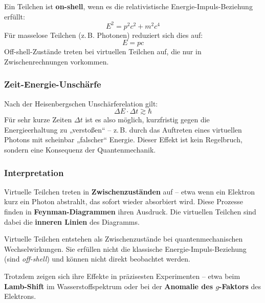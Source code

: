 \begin{tcolorbox}[hinweisbox, title=On-shell-Bedingung]
	\label{box:On-shell-Bedingung}
	Ein Teilchen ist \textbf{on-shell}, wenn es die relativistische Energie-Impuls-Beziehung erfüllt:
	\[
	E^2 = p^2 c^2 + m^2 c^4
	\]
	Für masselose Teilchen (z.\,B. Photonen) reduziert sich dies auf:
	\[
	E = pc
	\]
	Off-shell-Zustände treten bei virtuellen Teilchen auf, die nur in Zwischenrechnungen vorkommen.
\end{tcolorbox}

\subsubsection*{Zeit-Energie-Unschärfe}
Nach der Heisenbergschen Unschärferelation gilt:
\[
\Delta E \cdot \Delta t \gtrsim \hbar
\]\index{$\hbar$}
Für sehr kurze Zeiten $\Delta t$ ist es also möglich, kurzfristig gegen die Energieerhaltung zu „verstoßen“ – z.\,B. durch das Auftreten eines virtuellen Photons mit scheinbar „falscher“ Energie.
Dieser Effekt ist kein Regelbruch, sondern eine Konsequenz der Quantenmechanik.

\subsubsection*{Interpretation}

Virtuelle Teilchen treten in \textbf{Zwischenzuständen} auf – etwa wenn ein Elektron kurz ein Photon abstrahlt, das sofort wieder absorbiert wird.
Diese Prozesse finden in \textbf{Feynman-Diagrammen} ihren Ausdruck. Die virtuellen Teilchen sind dabei die \textbf{inneren Linien} des Diagramms.

\medskip


\medskip
\begin{tcolorbox}[physikbox, title=Virtuelle Teilchen im Quantenvakuum, label=box:virtuelle-teilchen]
	\label{box:virtuelle-teilchen}
	Virtuelle Teilchen entstehen als Zwischenzustände bei quantenmechanischen Wechselwirkungen. Sie erfüllen nicht die klassische Energie-Impuls-Beziehung (sind \emph{off-shell}) und können nicht direkt beobachtet werden.
	
	Trotzdem zeigen sich ihre Effekte in präzisesten Experimenten – etwa beim \textbf{Lamb-Shift} im Wasserstoffspektrum oder bei der \textbf{Anomalie des $g$-Faktors} des Elektrons.
\end{tcolorbox}

